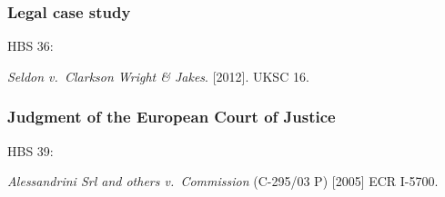 \subsubsection*{Legal case study}

HBS 36: \cite{seldon-v-c.w.j2012}

\emph{Seldon v.~Clarkson Wright \& Jakes}. [2012]. UKSC 16.



\subsubsection*{Judgment of the European Court of Justice}

HBS 39: \cite{srl.etal-v-comm2005}

\emph{Alessandrini Srl and others v.~Commission} (C-295/03 P) [2005] ECR I-5700.


